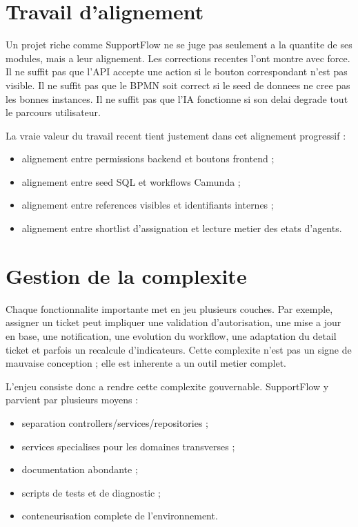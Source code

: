 \documentclass[12pt,a4paper,oneside]{report}
\begin{document}
\section{Travail d'alignement}

Un projet riche comme SupportFlow ne se juge pas seulement a la quantite de ses modules, mais a leur alignement. Les corrections recentes l'ont montre avec force. Il ne suffit pas que l'API accepte une action si le bouton correspondant n'est pas visible. Il ne suffit pas que le BPMN soit correct si le seed de donnees ne cree pas les bonnes instances. Il ne suffit pas que l'IA fonctionne si son delai degrade tout le parcours utilisateur.

La vraie valeur du travail recent tient justement dans cet alignement progressif :

\begin{itemize}[leftmargin=1.2cm]
  \item alignement entre permissions backend et boutons frontend ;
  \item alignement entre seed SQL et workflows Camunda ;
  \item alignement entre references visibles et identifiants internes ;
  \item alignement entre shortlist d'assignation et lecture metier des etats d'agents.
\end{itemize}

\section{Gestion de la complexite}

Chaque fonctionnalite importante met en jeu plusieurs couches. Par exemple, assigner un ticket peut impliquer une validation d'autorisation, une mise a jour en base, une notification, une evolution du workflow, une adaptation du detail ticket et parfois un recalcule d'indicateurs. Cette complexite n'est pas un signe de mauvaise conception ; elle est inherente a un outil metier complet.

L'enjeu consiste donc a rendre cette complexite gouvernable. SupportFlow y parvient par plusieurs moyens :

\begin{itemize}[leftmargin=1.2cm]
  \item separation controllers/services/repositories ;
  \item services specialises pour les domaines transverses ;
  \item documentation abondante ;
  \item scripts de tests et de diagnostic ;
  \item conteneurisation complete de l'environnement.
\end{itemize}
\end{document}
